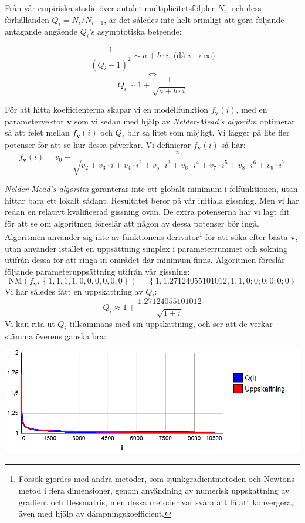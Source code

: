 Från vår empiriska studie över antalet multiplicitetsföljder $N_i$, och dess förhållanden $Q_i=N_i/N_{i-1}$, är det således inte helt orimligt att göra följande antagande angående $Q_i$'s asymptotiska beteende:

\[\frac{1}{\left(Q_i-1\right)^2} \sim a+b\cdot i \text{, (då $i \rightarrow \infty$)}\]
\[\Longleftrightarrow \]
\[Q_i \sim 1+\frac{1}{\sqrt{a+b\cdot i}} \]

För att hitta koefficienterna skapar vi en modellfunktion $f_\mathbf{v}(i)$, med en parametervektor $\mathbf{v}$ som vi sedan med hjälp av \emph{Nelder-Mead's algoritm} \cite{NelderMead} optimerar så att felet mellan $f_\mathbf{v}(i)$ och $Q_i$ blir så litet som möjligt. Vi lägger på lite fler potenser för att se hur dessa påverkar. Vi definierar $f_\mathbf{v}(i)$ så här:
\[f_\mathbf{v}(i)=v_0+\frac{v_1}{\sqrt{v_2+v_3\cdot i+v_4\cdot i^2+v_5\cdot i^3+v_6\cdot i^4+v_7\cdot i^5+v_8\cdot i^6+v_9\cdot i^7}}\]

\emph{Nelder-Mead's algoritm} garanterar inte ett globalt minimum i felfunktionen, utan hittar bara ett lokalt sådant. Resultatet beror på vår initiala gissning. Men vi har redan en relativt kvalificerad gissning ovan. De extra potenserna har vi lagt dit för att se om algoritmen föreslår att någon av dessa potenser bör ingå. Algoritmen använder sig inte av funktionens derivator\footnote{Försök gjordes med andra metoder, som sjunkgradientmetoden och Newtons metod i flera dimensioner, genom användning av numerisk uppskattning av gradient och Hessmatris, men dessa metoder var svåra att få att konvergera, även med hjälp av dämpningskoefficient.} för att söka efter bästa $\mathbf{v}$, utan använder istället en uppsättning simplex i parameterrummet och sökning utifrån dessa för att ringa in området där minimum finns. Algoritmen föreslår följande parameteruppsättning utifrån vår gissning:
\[\text{NM}(f_\mathbf{v},\left\{1,1,1,1,0,0,0,0,0,0\right\})= \left\{1, 1.27124055101012, 1, 1, 0; 0; 0; 0; 0; 0\right\}\]
Vi har således fått en uppskattning av $Q_i$:
\[Q_i \approx 1+\frac{1.27124055101012}{\sqrt{1+i}} \]
Vi kan rita ut $Q_i$ tillsammans med sin uppskattning, och ser att de verkar stämma överens ganska bra:

\begin{center}
\includegraphics[scale=0.5]{Export/Complexity17.png}
\end{center}

